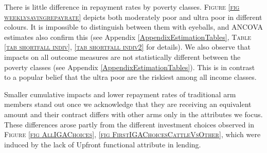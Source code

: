 	There is little difference in repayment rates by poverty classes. \textsc{\footnotesize Figure \ref{fig weeklysavingrepayrate}} depicts both moderately poor and ultra poor in different colours. It is impossible to distinguish between them with eyeballs, and ANCOVA estimates also confirm this  (see Appendix \ref{AppendixEstimationTables}, \textsc{\small Table \ref{tab shortfall indiv}, \ref{tab shortfall indiv2}} for details). We also observe that impacts on all outcome measures are not statistically different between the poverty classes (see Appendix \ref{AppendixEstimationTables}). This is in contrast to a popular belief that the ultra poor are the riskiest among all income classes. %

	Smaller cumulative impacts and lower repayment rates of \textsf{traditional} arm members stand out once we acknowledge that they are receiving an equivalent amount and their contract differs with other arms only in the attributes we focus. These differences arose partly from the different investment choices observed in \textsc{\small Figure \ref{fig AllIGAChoices}, \ref{fig FirstIGAChoicesCattleVsOther}}, which were induced by the lack of \textsf{Upfront} functional attribute in lending.
	
